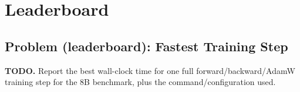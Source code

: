 \documentclass[11pt]{article}
\newcommand{\todoanswer}[1]{%
  \par\smallskip
  \noindent\colorbox{yellow!18}{%
    \parbox{\dimexpr\linewidth-2\fboxsep\relax}{\textbf{TODO.} #1}%
  }%
  \par\smallskip
}
\begin{document}
\section{Leaderboard}

\subsection{Problem (leaderboard): Fastest Training Step}

\todoanswer{Report the best wall-clock time for one full forward/backward/AdamW training step for the 8B benchmark, plus the command/configuration used.}
\end{document}
